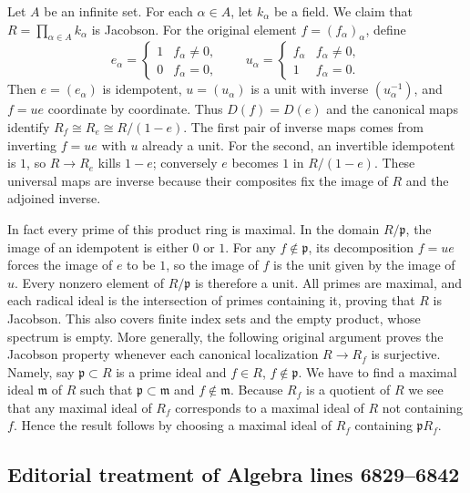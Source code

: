 \begin{example}
\label{editorial-source-example-infinite-product-fields-jacobson}
Let $A$ be an infinite set.
For each $\alpha \in A$, let $k_\alpha$ be a field.
We claim that $R = \prod_{\alpha\in A} k_\alpha$ is Jacobson.
For the original element $f=(f_\alpha)_\alpha$, define
$$
e_\alpha=\begin{cases}1&f_\alpha\ne0,\\0&f_\alpha=0,\end{cases}
\qquad
u_\alpha=\begin{cases}f_\alpha&f_\alpha\ne0,\\1&f_\alpha=0.\end{cases}
$$
Then $e=(e_\alpha)$ is idempotent, $u=(u_\alpha)$ is a unit with
inverse $(u_\alpha^{-1})$, and $f=ue$ coordinate by coordinate.
Thus $D(f)=D(e)$ and the canonical maps identify
$R_f\cong R_e\cong R/(1-e)$. The first pair of inverse maps comes
from inverting $f=ue$ with $u$ already a unit. For the second, an
invertible idempotent is $1$, so $R\to R_e$ kills $1-e$; conversely
$e$ becomes $1$ in $R/(1-e)$. These universal maps are inverse
because their composites fix the image of $R$ and the adjoined inverse.

In fact every prime of this product ring is maximal. In the domain
$R/\mathfrak p$, the image of an idempotent is either $0$ or $1$.
For any $f\notin\mathfrak p$, its decomposition $f=ue$ forces the
image of $e$ to be $1$, so the image of $f$ is the unit given by
the image of $u$. Every nonzero element of $R/\mathfrak p$ is
therefore a unit. All primes are maximal, and each radical ideal
is the intersection of primes containing it, proving that $R$ is Jacobson.
This also covers finite index sets and the empty product, whose
spectrum is empty. More generally, the following original argument
proves the Jacobson property whenever each canonical localization
$R\to R_f$ is surjective.
Namely, say $\mathfrak p \subset R$ is a prime ideal
and $f \in R$, $f \not \in \mathfrak p$. We have to find
a maximal ideal $\mathfrak m$ of $R$ such that
$\mathfrak p \subset \mathfrak m$ and $f \not\in \mathfrak m$.
Because $R_f$ is a quotient of $R$ we see that any maximal
ideal of $R_f$ corresponds to a maximal ideal of $R$
not containing $f$. Hence the result follows
by choosing a maximal ideal of $R_f$ containing $\mathfrak p R_f$.
\end{example}


\subsection{Editorial treatment of Algebra lines 6829--6842}

